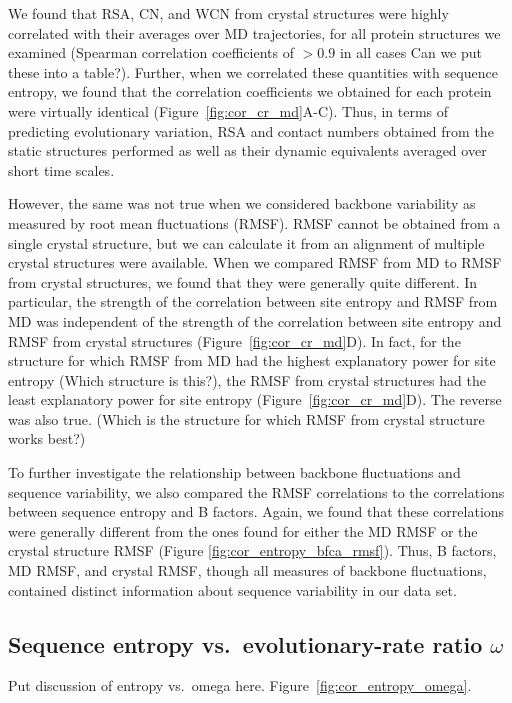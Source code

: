 \documentclass[12pt]{article}
\begin{document}
We found that RSA, CN, and WCN from crystal structures were highly correlated with their averages over MD trajectories, for all protein structures we examined (Spearman correlation coefficients of $>0.9$ in all cases {\color{red}Can we put these into a table?}). Further, when we correlated these quantities with sequence entropy, we found that the correlation coefficients we obtained for each protein were virtually identical (Figure~\ref{fig:cor_cr_md}A-C). Thus, in terms of predicting evolutionary variation, RSA and contact numbers obtained from the static structures performed as well as their dynamic equivalents averaged over short time scales.

However, the same was not true when we considered backbone variability as measured by root mean fluctuations (RMSF). RMSF cannot be obtained from a single crystal structure, but we can calculate it from an alignment of multiple crystal structures were available. When we compared RMSF from MD to RMSF from crystal structures, we found that they were generally quite different. In particular, the strength of the correlation between site entropy and RMSF from MD was independent of the strength of the correlation between site entropy and RMSF from crystal structures (Figure~\ref{fig:cor_cr_md}D). In fact, for the structure for which RMSF from MD had the highest explanatory power for site entropy {\color{red}(Which structure is this?)}, the RMSF from crystal structures had the least explanatory power for site entropy (Figure~\ref{fig:cor_cr_md}D). The reverse was also true. {\color{red}(Which is the structure for which RMSF from crystal structure works best?)}

To further investigate the relationship between backbone fluctuations and sequence variability, we also compared the RMSF correlations to the correlations between sequence entropy and B factors. Again, we found that these correlations were generally different from the ones found for either the MD RMSF or the crystal structure RMSF (Figure \ref{fig:cor_entropy_bfca_rmsf}). Thus, B factors, MD RMSF, and crystal RMSF, though all measures of backbone fluctuations, contained distinct information about sequence variability in our data set.

\subsection*{Sequence entropy vs.\ evolutionary-rate ratio $\omega$}


{\color{blue} Put discussion of entropy vs.\ omega here. Figure~\ref{fig:cor_entropy_omega}.}
\end{document}
